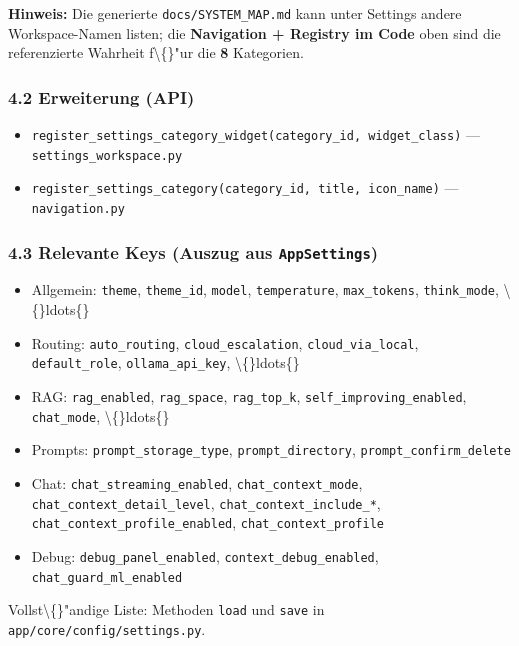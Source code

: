 \textbf{Hinweis:} Die generierte \texttt{docs/SYSTEM\_MAP.md} kann unter Settings andere Workspace-Namen listen; die \textbf{Navigation + Registry im Code} oben sind die referenzierte Wahrheit f\textbackslash\{\}"ur die \textbf{8} Kategorien.

\subsubsection{4.2 Erweiterung (API)}

\begin{itemize}
\item \texttt{register\_settings\_category\_widget(category\_id, widget\_class)} --- \texttt{settings\_workspace.py}
\item \texttt{register\_settings\_category(category\_id, title, icon\_name)} --- \texttt{navigation.py}
\end{itemize}

\subsubsection{4.3 Relevante Keys (Auszug aus \texttt{AppSettings})}

\begin{itemize}
\item Allgemein: \texttt{theme}, \texttt{theme\_id}, \texttt{model}, \texttt{temperature}, \texttt{max\_tokens}, \texttt{think\_mode}, \textbackslash\{\}ldots\{\}
\item Routing: \texttt{auto\_routing}, \texttt{cloud\_escalation}, \texttt{cloud\_via\_local}, \texttt{default\_role}, \texttt{ollama\_api\_key}, \textbackslash\{\}ldots\{\}
\item RAG: \texttt{rag\_enabled}, \texttt{rag\_space}, \texttt{rag\_top\_k}, \texttt{self\_improving\_enabled}, \texttt{chat\_mode}, \textbackslash\{\}ldots\{\}
\item Prompts: \texttt{prompt\_storage\_type}, \texttt{prompt\_directory}, \texttt{prompt\_confirm\_delete}
\item Chat: \texttt{chat\_streaming\_enabled}, \texttt{chat\_context\_mode}, \texttt{chat\_context\_detail\_level}, \texttt{chat\_context\_include\_*}, \texttt{chat\_context\_profile\_enabled}, \texttt{chat\_context\_profile}
\item Debug: \texttt{debug\_panel\_enabled}, \texttt{context\_debug\_enabled}, \texttt{chat\_guard\_ml\_enabled}
\end{itemize}

Vollst\textbackslash\{\}"andige Liste: Methoden \texttt{load} und \texttt{save} in \texttt{app/core/config/settings.py}.

